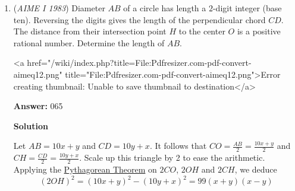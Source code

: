 \begin{enumerate}
\textbf{Solution 4}

Draw an altitude from a vertex of the square base to the top edge. By using $30,60, 90$ triangle ratios, we obtain that the altitude has a length of $3 \sqrt{6}$, and that little portion that hangs out has a length of $3\sqrt2$. This is a triangular pyramid with a base of $3\sqrt6, 3\sqrt6, 3\sqrt2$, and a height of $3\sqrt{2}$. Since there are two of these, we can compute the sum of the volumes of these two to be $72$. Now we are left with a triangular prism with a base of dimensions $3\sqrt6, 3\sqrt6, 3\sqrt2$ and a height of $6\sqrt2$. We can compute the volume of this to be 216, and thus our answer is $\boxed{288}$.

 pi\_is\_3.141

 



\textbf{Solution 5}

From solution 1, the height of the solid is $6$. Construct a triangular prism with base ABCD, and with the height of the solid. The volume of this triangular prism is $( 6\sqrt{2} )^2 \cdot 6 \cdot 1/2 = 216$ Notice that the solid is symetrical, and if you remove the triangular prism described earlier and combine the two halves on each side of it, you will get a regular tetrahedron. This tetrahedron has sidelength of $6\sqrt{2}$ and since the formula for the volume of a regular tetrahedron is $\frac{s^3}{6\sqrt{2}}$ the volume of this tetrahedron is $72$. $216 + 72 = \boxed{288}$. 

 


	\item (\textit{AIME I 1983}) Diameter $AB$ of a circle has length a $2$-digit integer (base ten). Reversing the digits gives the length of the perpendicular chord $CD$. The distance from their intersection point $H$ to the center $O$ is a positive rational number. Determine the length of $AB$.


 <a href="/wiki/index.php?title=File:Pdfresizer.com-pdf-convert-aimeq12.png" title="File:Pdfresizer.com-pdf-convert-aimeq12.png">Error creating thumbnail: Unable to save thumbnail to destination</a>

 \textbf{Answer: }065



\textbf{Solution}

Let $AB=10x+y$ and $CD=10y+x$. It follows that $CO=\frac{AB}{2}=\frac{10x+y}{2}$ and $CH=\frac{CD}{2}=\frac{10y+x}{2}$. Scale up this triangle by 2 to ease the arithmetic. Applying the \href{https://artofproblemsolving.com/wiki/index.php?title=Pythagorean\_Theorem}{Pythagorean Theorem} on $2CO$, $2OH$ and $2CH$, we deduce
 \[(2OH)^2=\left(10x+y\right)^2-\left(10y+x\right)^2=99(x+y)(x-y)\] 


\end{enumerate}
